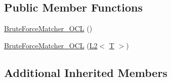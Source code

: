 \subsection*{Public Member Functions}
\begin{DoxyCompactItemize}
\item 
\hyperlink{classcv_1_1ocl_1_1BruteForceMatcher__OCL_3_01L2_3_01T_01_4_01_4_a5de8906f9b0865394d0d16e82a71abda}{Brute\-Force\-Matcher\-\_\-\-O\-C\-L} ()
\item 
\hyperlink{classcv_1_1ocl_1_1BruteForceMatcher__OCL_3_01L2_3_01T_01_4_01_4_a5b2bc65fdc5cf92ce59339df7782fad3}{Brute\-Force\-Matcher\-\_\-\-O\-C\-L} (\hyperlink{structcv_1_1ocl_1_1L2}{L2}$<$ \hyperlink{calib3d_8hpp_a3efb9551a871ddd0463079a808916717}{T} $>$)
\end{DoxyCompactItemize}
\subsection*{Additional Inherited Members}


